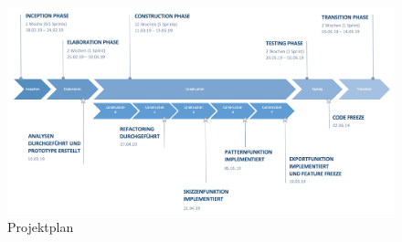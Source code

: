 \begin{landscape}
	\label{subsec:timeline}
		\begin{figure}[h]
			\centering
			\includegraphics[width=1\linewidth]{img/projekt-plan/projekt-plan}
			\caption[Projektplan]{Projektplan}
			\label{fig:projekt-plan}
		\end{figure}
	\vspace{0.5cm}
\end{landscape}

